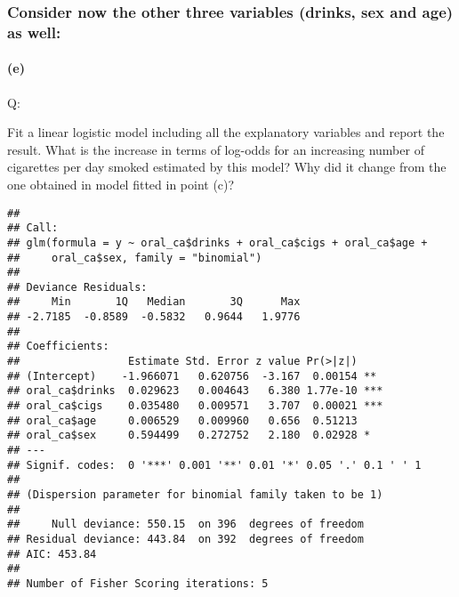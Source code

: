 \documentclass[
]{article}
\newenvironment{Shaded}{\begin{snugshade}}{\end{snugshade}}
\newcommand{\DataTypeTok}[1]{\textcolor[rgb]{0.13,0.29,0.53}{#1}}
\newcommand{\KeywordTok}[1]{\textcolor[rgb]{0.13,0.29,0.53}{\textbf{#1}}}
\newcommand{\NormalTok}[1]{#1}
\newcommand{\OperatorTok}[1]{\textcolor[rgb]{0.81,0.36,0.00}{\textbf{#1}}}
\newcommand{\StringTok}[1]{\textcolor[rgb]{0.31,0.60,0.02}{#1}}
\begin{document}
\hypertarget{consider-now-the-other-three-variables-drinks-sex-and-age-as-well}{%
\subsubsection{Consider now the other three variables (drinks, sex and
age) as
well:}\label{consider-now-the-other-three-variables-drinks-sex-and-age-as-well}}

\hypertarget{e}{%
\paragraph{(e)}\label{e}}

Q:

Fit a linear logistic model including all the explanatory variables and
report the result. What is the increase in terms of log-odds for an
increasing number of cigarettes per day smoked estimated by this model?
Why did it change from the one obtained in model ﬁtted in point (c)?

\begin{Shaded}
\end{Shaded}

\begin{verbatim}
## 
## Call:
## glm(formula = y ~ oral_ca$drinks + oral_ca$cigs + oral_ca$age + 
##     oral_ca$sex, family = "binomial")
## 
## Deviance Residuals: 
##     Min       1Q   Median       3Q      Max  
## -2.7185  -0.8589  -0.5832   0.9644   1.9776  
## 
## Coefficients:
##                 Estimate Std. Error z value Pr(>|z|)    
## (Intercept)    -1.966071   0.620756  -3.167  0.00154 ** 
## oral_ca$drinks  0.029623   0.004643   6.380 1.77e-10 ***
## oral_ca$cigs    0.035480   0.009571   3.707  0.00021 ***
## oral_ca$age     0.006529   0.009960   0.656  0.51213    
## oral_ca$sex     0.594499   0.272752   2.180  0.02928 *  
## ---
## Signif. codes:  0 '***' 0.001 '**' 0.01 '*' 0.05 '.' 0.1 ' ' 1
## 
## (Dispersion parameter for binomial family taken to be 1)
## 
##     Null deviance: 550.15  on 396  degrees of freedom
## Residual deviance: 443.84  on 392  degrees of freedom
## AIC: 453.84
## 
## Number of Fisher Scoring iterations: 5
\end{verbatim}
\end{document}
